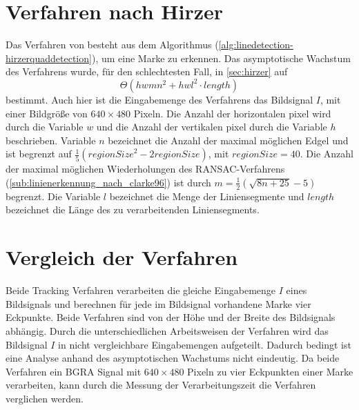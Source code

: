 \section{Verfahren nach Hirzer} %
\label{sec:ergebnisse-hirzer}
Das Verfahren von \citeauthor{hirzer08} besteht aus dem Algorithmus 
 (\autoref{alg:linedetection-hirzerquaddetection}), um eine Marke zu erkennen. Das asymptotische Wachstum des
 Verfahrens wurde, für den schlechtesten Fall, in \autoref{sec:hirzer} auf
\begin{equation*}
\Theta(hwmn^2+hwl^2\cdot\mathit{length})
\end{equation*}
bestimmt. Auch hier ist die Eingabemenge des Verfahrens das Bildsignal $I$, mit einer Bildgröße von $640 \times 480$
 Pixeln. Die Anzahl der horizontalen \gls{pixel} wird durch die Variable $w$ und die Anzahl der vertikalen
 \gls{pixel} durch die Variable $h$ beschrieben. Variable $n$ bezeichnet die Anzahl der maximal möglichen Edgel und ist
 begrenzt auf $\tfrac{1}{5}(\mathit{regionSize}^2 - 2\mathit{regionSize})$, mit $\mathit{regionSize} = 40$. Die Anzahl
 der maximal möglichen Wiederholungen des RANSAC-Verfahrens (\autoref{sub:linienerkennung_nach_clarke96}) ist durch
 $m = \tfrac{1}{2}(\sqrt{8n + 25} - 5)$ begrenzt. Die Variable $l$ bezeichnet die Menge der Liniensegmente und
 $\mathit{length}$ bezeichnet die Länge des zu verarbeitenden Liniensegments.

\section{Vergleich der Verfahren} %
\label{sec:vergleich_der_verfahren}
Beide Tracking Verfahren verarbeiten die gleiche Eingabemenge $I$ eines Bildsignals und berechnen für jede im
 Bildsignal vorhandene Marke vier Eckpunkte. Beide Verfahren sind von der Höhe und der Breite des Bildsignals abhängig.
 Durch die unterschiedlichen Arbeitsweisen der Verfahren wird das Bildsignal $I$ in nicht vergleichbare Eingabemengen
 aufgeteilt. Dadurch bedingt ist eine Analyse anhand des asymptotischen Wachstums nicht eindeutig. Da beide Verfahren
 ein BGRA Signal mit $640 \times 480$ Pixeln zu vier Eckpunkten einer Marke verarbeiten, kann durch die Messung
 der Verarbeitungszeit die Verfahren verglichen werden.

